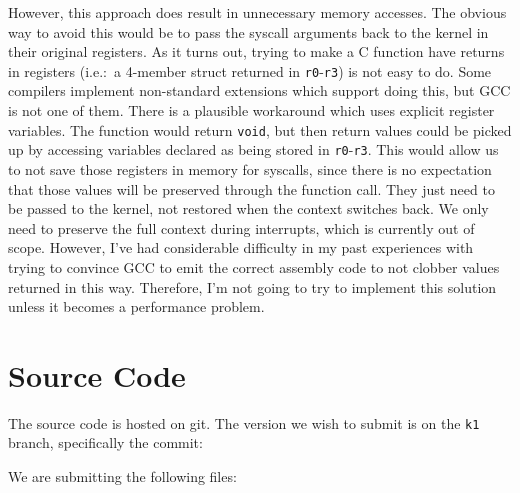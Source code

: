 \documentclass[titlepage]{article}
\begin{document}
However, this approach does result in unnecessary memory accesses.
The obvious way to avoid this would be to pass the syscall arguments back to the kernel
in their original registers.
As it turns out, trying to make a C function have returns in registers (i.e.:\ a 4-member
struct returned in \texttt{r0}-\texttt{r3}) is not easy to do.
Some compilers implement non-standard extensions which support doing this, but GCC
is not one of them.
There is a plausible workaround which uses explicit register variables.
The function would return \texttt{void}, but then return values could be picked up
by accessing variables declared as being stored in \texttt{r0}-\texttt{r3}.
This would allow us to not save those registers in memory for syscalls, since
there is no expectation that those values will be preserved through the function call.
They just need to be passed to the kernel, not restored when the context switches back.
We only need to preserve the full context during interrupts, which is
currently out of scope.
However, I've had considerable difficulty in my past experiences with trying to
convince GCC to emit the correct assembly code to not clobber values returned in this
way.
Therefore, I'm not going to try to implement this solution unless it becomes a
performance problem.

\section{Source Code}
The source code is hosted on git.
The version we wish to submit is on the \texttt{k1} branch, specifically
the commit:

We are submitting the following files:


\end{document}
